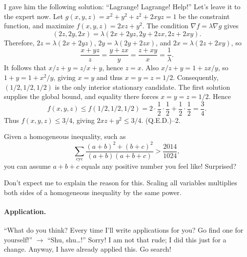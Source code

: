 \documentclass[11pt,a4paper]{article}
\begin{document}
I gave him the following solution: ``Lagrange! Lagrange! Help!''
Let's leave it to the expert now.
Let $g(x,y,z)=x^2+y^2+z^2+2xyz=1$ be the constraint function, and maximize
$f(x,y,z)=2xz+y^2$.
The condition $\nabla f=\lambda\nabla g$ gives
\[(2z,2y,2x)=\lambda(2x+2yz,2y+2zx,2z+2xy).\]
Therefore, $2z=\lambda(2x+2yz)$, $2y=\lambda(2y+2zx)$, and
$2x=\lambda(2z+2xy)$, so
\[
\frac{x+yz}{z}=\frac{y+zx}{y}=\frac{z+xy}{x}=\frac1\lambda.
\]
It follows that $x/z+y=z/x+y$, hence $z=x$.
Also $x/z+y=1+zx/y$, so $1+y=1+x^2/y$, giving $x=y$ and thus
$x=y=z=1/2$.
Consequently, $(1/2,1/2,1/2)$ is the only interior stationary candidate.
The first solution supplies the global bound, and equality there forces
$x=y=z=1/2$. Hence
\[
f(x,y,z)\leq f(1/2,1/2,1/2)
=2\cdot\frac12\cdot\frac12+\frac12\cdot\frac12=\frac34.
\]
Thus $f(x,y,z)\leq3/4$, giving $2xz+y^2\leq3/4$. (Q.E.D.)--2.


\setcounter{theorem}{80}\begin{lemma}[Normalization]\label{lemma:lb1-83}
Given a homogeneous inequality, such as
\[\sum_{\mathrm{cyc}}\frac{(a+b)^2+(b+c)^2}{(a+b)(a+b+c)}>\frac{2014}{1024},\]
you can assume $a+b+c$ equals any positive number you feel like! Surprised?
\end{lemma}
Don't expect me to explain the reason for this.
Scaling all variables multiplies both sides of a homogeneous inequality by the same power.
\paragraph{Application.}
``What do you think? Every time I'll write applications for you? Go find one for yourself!''
$\longrightarrow$ ``Shu, shu\ldots!''
Sorry! I am not that rude; I did this just for a change.
Anyway, I have already applied this. Go search!
\end{document}
